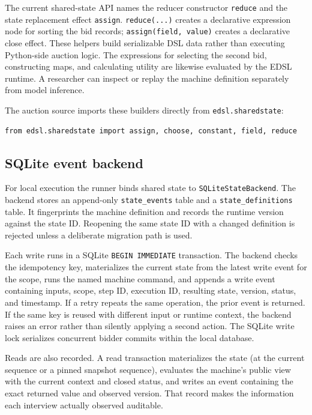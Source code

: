 \documentclass[11pt]{article}
\begin{document}
The current shared-state API names the reducer constructor \texttt{reduce} and the state replacement effect \texttt{assign}. \texttt{reduce(...)} creates a declarative expression node for sorting the bid records; \texttt{assign(field, value)} creates a declarative close effect. These helpers build serializable DSL data rather than executing Python-side auction logic. The expressions for selecting the second bid, constructing maps, and calculating utility are likewise evaluated by the EDSL runtime. A researcher can inspect or replay the machine definition separately from model inference.

The auction source imports these builders directly from \texttt{edsl.sharedstate}:
\begin{lstlisting}[style=python]
from edsl.sharedstate import assign, choose, constant, field, reduce
\end{lstlisting}

\subsection{SQLite event backend}

For local execution the runner binds shared state to \texttt{SQLiteStateBackend}. The backend stores an append-only \texttt{state\_events} table and a \texttt{state\_definitions} table. It fingerprints the machine definition and records the runtime version against the state ID. Reopening the same state ID with a changed definition is rejected unless a deliberate migration path is used.

Each write runs in a SQLite \texttt{BEGIN IMMEDIATE} transaction. The backend checks the idempotency key, materializes the current state from the latest write event for the scope, runs the named machine command, and appends a write event containing inputs, scope, step ID, execution ID, resulting state, version, status, and timestamp. If a retry repeats the same operation, the prior event is returned. If the same key is reused with different input or runtime context, the backend raises an error rather than silently applying a second action. The SQLite write lock serializes concurrent bidder commits within the local database.

Reads are also recorded. A read transaction materializes the state (at the current sequence or a pinned snapshot sequence), evaluates the machine's public view with the current context and closed status, and writes an event containing the exact returned value and observed version. That record makes the information each interview actually observed auditable.
\end{document}

